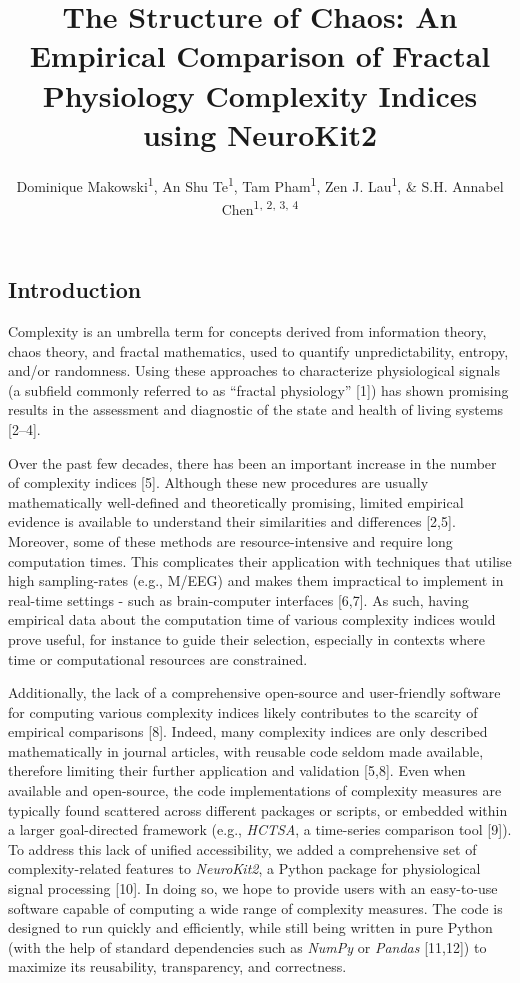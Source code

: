 \documentclass[
  man]{apa6}
\title{\textbf{The Structure of Chaos: An Empirical Comparison of Fractal Physiology Complexity Indices using NeuroKit2}}
\author{Dominique Makowski\textsuperscript{1}, An Shu Te\textsuperscript{1}, Tam Pham\textsuperscript{1}, Zen J. Lau\textsuperscript{1}, \& S.H. Annabel Chen\textsuperscript{1, 2, 3, 4}}
\date{}
\affiliation{\vspace{0.5cm}\textsuperscript{1} School of Social Sciences, Nanyang Technological University, Singapore\\\textsuperscript{2} LKC Medicine, Nanyang Technological University, Singapore\\\textsuperscript{3} National Institute of Education, Singapore\\\textsuperscript{4} Centre for Research and Development in Learning, Nanyang Technological University, Singapore}
\begin{document}
\maketitle

\hypertarget{introduction}{%
\subsection{Introduction}\label{introduction}}

Complexity is an umbrella term for concepts derived from information theory, chaos theory, and fractal mathematics, used to quantify unpredictability, entropy, and/or randomness. Using these approaches to characterize physiological signals (a subfield commonly referred to as ``fractal physiology'' {[}1{]}) has shown promising results in the assessment and diagnostic of the state and health of living systems {[}2--4{]}.

Over the past few decades, there has been an important increase in the number of complexity indices {[}5{]}. Although these new procedures are usually mathematically well-defined and theoretically promising, limited empirical evidence is available to understand their similarities and differences {[}2,5{]}. Moreover, some of these methods are resource-intensive and require long computation times. This complicates their application with techniques that utilise high sampling-rates (e.g., M/EEG) and makes them impractical to implement in real-time settings - such as brain-computer interfaces {[}6,7{]}. As such, having empirical data about the computation time of various complexity indices would prove useful, for instance to guide their selection, especially in contexts where time or computational resources are constrained.

Additionally, the lack of a comprehensive open-source and user-friendly software for computing various complexity indices likely contributes to the scarcity of empirical comparisons {[}8{]}. Indeed, many complexity indices are only described mathematically in journal articles, with reusable code seldom made available, therefore limiting their further application and validation {[}5,8{]}. Even when available and open-source, the code implementations of complexity measures are typically found scattered across different packages or scripts, or embedded within a larger goal-directed framework (e.g., \emph{HCTSA}, a time-series comparison tool {[}9{]}). To address this lack of unified accessibility, we added a comprehensive set of complexity-related features to \emph{NeuroKit2}, a Python package for physiological signal processing {[}10{]}. In doing so, we hope to provide users with an easy-to-use software capable of computing a wide range of complexity measures. The code is designed to run quickly and efficiently, while still being written in pure Python (with the help of standard dependencies such as \emph{NumPy} or \emph{Pandas} {[}11,12{]}) to maximize its reusability, transparency, and correctness.
\end{document}
